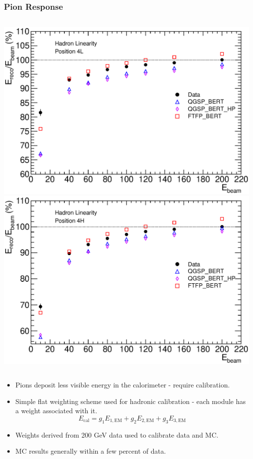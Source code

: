 \documentclass[10pt]{beamer}
\begin{document}
\begin{frame}\frametitle{Pion Response}
\begin{columns}
\includegraphics[width=0.95\linewidth,angle=0]{FCalTB_plots/hadron_linearity_4L.eps}
\includegraphics[width=0.95\linewidth,angle=0]{FCalTB_plots/hadron_linearity_4H.eps}
\end{columns}
\begin{itemize}
\item Pions deposit less visible energy in the calorimeter - require calibration.
\item Simple flat weighting scheme used for hadronic calibration - each module has a weight associated with it.
\begin{equation*}
E_\mathrm{cal} = g_1 E_{1,\mathrm{EM}} +g_2 E_{2,\mathrm{EM}} +g_3 E_{3,\mathrm{EM}}
\end{equation*}
\item Weights derived from 200 GeV data used to calibrate data and MC.
\item MC results generally within a few percent of data.
\end{itemize}
\end{frame}
\end{document}
